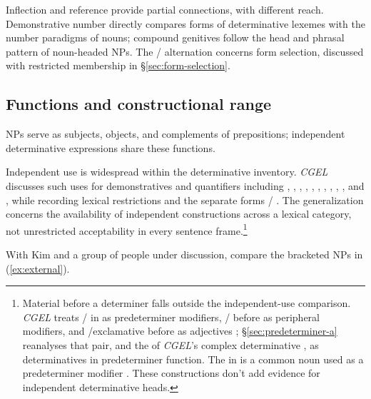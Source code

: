 \documentclass[12pt]{article}
\begin{document}
Inflection and reference provide partial connections, with different reach. Demonstrative number directly compares forms of determinative lexemes with the number paradigms of nouns; compound genitives follow the head and phrasal pattern of noun-headed NPs. The /\allowbreak{} alternation concerns form selection, discussed with restricted membership in §\ref{sec:form-selection}.

\subsection{Functions and constructional range}\label{sec:independent}

NPs serve as subjects, objects, and complements of prepositions; independent determinative expressions share these functions.

Independent use is widespread within the determinative inventory. \textit{CGEL} discusses such uses for demonstratives and quantifiers including , , , , , , , , , , and , while recording lexical restrictions and the separate forms / \citep[371--372, 410--424]{huddleston2002}. The generalization concerns the availability of independent constructions across a lexical category, not unrestricted acceptability in every sentence frame.\footnote{Material before a determiner falls outside the independent-use comparison. \textit{CGEL} treats / in  as predeterminer modifiers, / before  as peripheral modifiers, and /exclamative  before  as adjectives \citep[433--437]{huddleston2002}; §\ref{sec:predeterminer-a} reanalyses that pair, and the  of \textit{CGEL}'s complex determinative  \citep[394]{huddleston2002}, as determinatives in predeterminer function. The  in  is a common noun used as a predeterminer modifier \citep[434]{huddleston2002}. These constructions don't add evidence for independent determinative heads.}

With Kim and a group of people under discussion, compare the bracketed NPs in (\ref{ex:external}).

\begin{samepage}

\ea\label{ex:external}
\ea {}\qquad {}\qquad {}
\ex {}\qquad {}\qquad {}
\ex {}\qquad {}\qquad {}
\ex {}\qquad {}\qquad {}
\z\z

\end{samepage}
\end{document}
